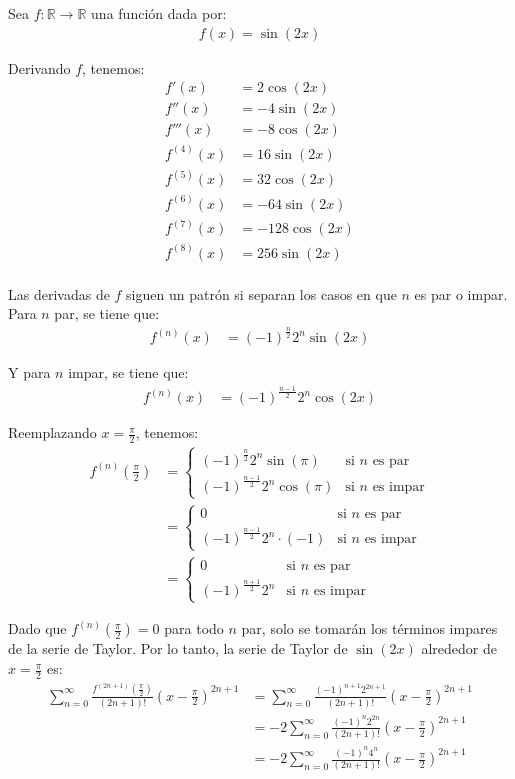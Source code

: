 \documentclass{article}
\newcommand{\R}{\mathbb{R}}
\begin{document}
Sea $f : \R \to \R$ una función dada por:
\begin{align*}
f(x) = \sin(2x)
\end{align*}

Derivando $f$, tenemos:
\begin{align*}
f'(x) &= 2 \cos(2x) \\
f''(x) &= -4 \sin(2x) \\
f'''(x) &= -8 \cos(2x) \\
f^{(4)}(x) &= 16 \sin(2x) \\
f^{(5)}(x) &= 32 \cos(2x) \\
f^{(6)}(x) &= -64 \sin(2x) \\
f^{(7)}(x) &= -128 \cos(2x) \\
f^{(8)}(x) &= 256 \sin(2x) \\
\end{align*}

Las derivadas de $f$ siguen un patrón si separan los casos en que $n$ es par o impar. Para $n$ par, se tiene que:
\begin{align*}
f^{(n)}(x) &= (-1)^{\frac{n}{2}} 2^n \sin(2x)
\end{align*}

Y para $n$ impar, se tiene que:
\begin{align*}
f^{(n)}(x) &= (-1)^{\frac{n-1}{2}} 2^n \cos(2x)
\end{align*}

Reemplazando $x = \frac{\pi}{2}$, tenemos:
\begin{align*}
f^{(n)}\left(\frac{\pi}{2}\right) &= \begin{cases}
(-1)^{\frac{n}{2}} 2^n \sin(\pi) & \text{si } n \text{ es par} \\
(-1)^{\frac{n-1}{2}} 2^n \cos(\pi) & \text{si } n \text{ es impar}
\end{cases} \\
&= \begin{cases}
0 & \text{si } n \text{ es par} \\
(-1)^{\frac{n-1}{2}} 2^n \cdot (-1) & \text{si } n \text{ es impar}
\end{cases} \\
&= \begin{cases}
0 & \text{si } n \text{ es par} \\
(-1)^{\frac{n+1}{2}} 2^n & \text{si } n \text{ es impar}
\end{cases} 
\end{align*}

Dado que $f^{(n)}\left(\frac{\pi}{2}\right) = 0$ para todo $n$ par, solo se tomarán los términos impares de la serie de Taylor. Por lo tanto, la serie de Taylor de $\sin(2x)$ alrededor de $x = \frac{\pi}{2}$ es:
\begin{align*}
\sum_{n=0}^{\infty} \frac{f^{(2n+1)}\left(\frac{\pi}{2}\right)}{(2n+1)!} \left(x - \frac{\pi}{2}\right)^{2n+1} &= \sum_{n=0}^{\infty} \frac{(-1)^{n+1} 2^{2n+1}}{(2n+1)!} \left(x - \frac{\pi}{2}\right)^{2n+1} \\
&= -2 \sum_{n=0}^{\infty} \frac{(-1)^n 2^{2n}}{(2n+1)!} \left(x - \frac{\pi}{2}\right)^{2n+1} \\
&= -2 \sum_{n=0}^{\infty} \frac{(-1)^n 4^n}{(2n+1)!} \left(x - \frac{\pi}{2}\right)^{2n+1}
\end{align*}
\end{document}
